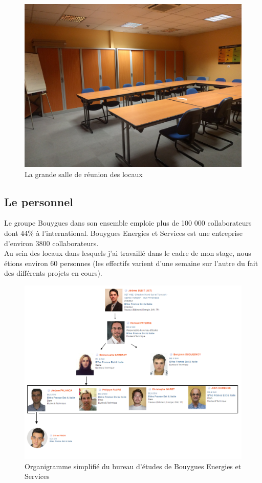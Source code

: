 \documentclass[a4paper]{article}
\begin{document}
    \begin{figure}[H]
        \centering
        \includegraphics[scale=0.05]{img/salleReu}
        \caption{La grande salle de réunion des locaux}
    \end{figure}

    \newpage

    \subsection{Le personnel}

    Le groupe Bouygues dans son ensemble emploie plus de 100 000 collaborateurs dont 44\% à l’international. Bouygues Energies et Services est une entreprise d'environ 3800 collaborateurs. \\

    Au sein des locaux dans lesquels j'ai travaillé dans le cadre de mon stage, nous étions environ 60 personnes (les effectifs varient d'une semaine sur l'autre du fait des différents projets en cours).  \\

    \begin{figure}[H]
        \centering
        \includegraphics[scale=0.45]{img/Organigramme}
        \caption{Organigramme simplifié du bureau d'études de Bouygues Energies et Services}
    \end{figure}
\end{document}
